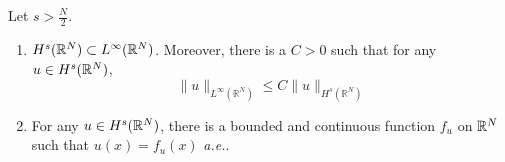 \begin{thm}
	Let $s > \frac{N}{2}$.
	\begin{enumerate}[label=(\arabic{*})]
		\item $H^s(\mathbb{R}^N) \subset L^\infty(\mathbb{R}^N)$. Moreover, there is a $C > 0$ such that for any $u \in H^s(\mathbb{R}^N)$,
		\begin{equation*}
			\|u\|_{L^{\infty}\left(\mathbb{R}^N\right)} \leq C\|u\|_{H^s\left(\mathbb{R}^N\right)}
		\end{equation*}

		\item For any $u \in H^s(\mathbb{R}^N)$, there is a bounded and continuous function $f_u$ on $\mathbb{R}^N$ such that $u(x) = f_u(x)$ \emph{a.e.}.
	\end{enumerate}
\end{thm}
